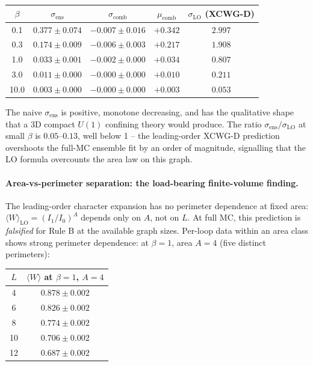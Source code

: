 \documentclass[11pt]{article}
\begin{document}
\begin{center}
\begin{tabular}{ccccc}
\toprule
$\beta$ & $\sigma_\text{ens}$ & $\sigma_\text{comb}$ &
$\mu_\text{comb}$ & $\sigma_\text{LO}$ (XCWG-D) \\
\midrule
0.1   & $0.377\pm 0.074$ & $-0.007\pm 0.016$ & $+0.342$ & $2.997$ \\
0.3   & $0.174\pm 0.009$ & $-0.006\pm 0.003$ & $+0.217$ & $1.908$ \\
1.0   & $0.033\pm 0.001$ & $-0.002\pm 0.000$ & $+0.034$ & $0.807$ \\
3.0   & $0.011\pm 0.000$ & $-0.000\pm 0.000$ & $+0.010$ & $0.211$ \\
10.0  & $0.003\pm 0.000$ & $-0.000\pm 0.000$ & $+0.003$ & $0.053$ \\
\bottomrule
\end{tabular}
\end{center}

The naive $\sigma_\text{ens}$ is positive, monotone decreasing, and has the
qualitative shape that a 3D compact $U(1)$ confining theory would produce.
The ratio $\sigma_\text{ens}/\sigma_\text{LO}$ at small $\beta$ is
$0.05$--$0.13$, well below 1 -- the leading-order XCWG-D prediction
overshoots the full-MC ensemble fit by an order of magnitude, signalling that
the LO formula overcounts the area law on this graph.

\paragraph{Area-vs-perimeter separation: the load-bearing finite-volume
finding.} The leading-order character expansion has no perimeter dependence
at fixed area: $\langle W\rangle_\text{LO}=(I_1/I_0)^A$ depends only on $A$,
not on $L$. At full MC, this prediction is \emph{falsified} for Rule B at the
available graph sizes. Per-loop data within an area class shows strong
perimeter dependence: at $\beta=1$, area $A=4$ (five distinct perimeters):

\begin{center}
\begin{tabular}{cc}
\toprule
$L$ & $\langle W\rangle$ at $\beta=1$, $A=4$ \\
\midrule
4  & $0.878\pm 0.002$ \\
6  & $0.826\pm 0.002$ \\
8  & $0.774\pm 0.002$ \\
10 & $0.706\pm 0.002$ \\
12 & $0.687\pm 0.002$ \\
\bottomrule
\end{tabular}
\end{center}
\end{document}
